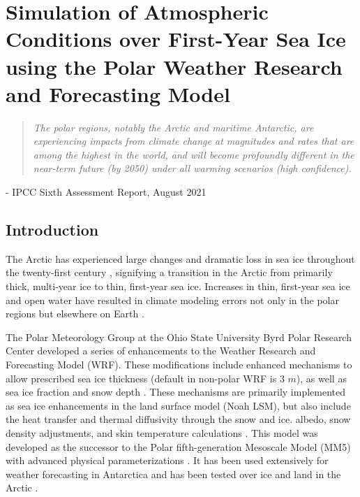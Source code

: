 \chapter{Simulation of Atmospheric Conditions over First-Year Sea Ice using the Polar Weather Research and Forecasting Model}
\vspace{1 cm}
\begin{spacing}{1} \begin{quote} 
\noindent \emph{The polar regions, notably the Arctic and maritime Antarctic, are experiencing impacts from climate change at magnitudes and rates that are among the highest in the world, and will become profoundly different in the near-term future (by 2050) under all warming scenarios (high confidence).}\end{quote}
\hspace{6 cm} - IPCC Sixth Assessment Report, August 2021  
\end{spacing}
\doublespacing
\section{Introduction}
The Arctic has experienced large changes and dramatic loss in sea ice throughout the twenty-first century \citep{hines:2015}, signifying a transition in the Arctic from primarily thick, multi-year ice to thin, first-year sea ice. Increases in thin, first-year sea ice and open water have resulted in climate modeling errors not only in the polar regions but elsewhere on Earth \citep{hines:2015, royer:1990, francis:2009}. 

The Polar Meteorology Group at the Ohio State University Byrd Polar Research Center developed a series of enhancements to the Weather Research and Forecasting Model (WRF). These modifications include enhanced mechanisms to allow prescribed sea ice thickness (default in non-polar WRF is 3 $m$), as well as sea ice fraction and snow depth \citep{hines:2015}. These mechanisms are primarily implemented as sea ice enhancements in the land surface model (Noah LSM), but also include the heat transfer and thermal diffusivity through the snow and ice. albedo, snow density adjustments, and skin temperature calculations \citep{tastula:2012, hines:2015}. This model was developed as the successor to the Polar fifth-generation Mesoscale Model (MM5) with advanced physical parameterizations \citep{bromwich:2009}. It has been used extensively for weather forecasting in Antarctica \citep{powers:2012} and has been tested over ice and land in the Arctic \citep{tastula:2012, bromwich:2009}. 

